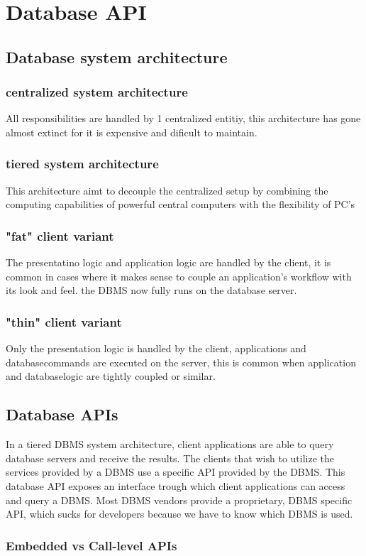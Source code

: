 \documentclass{report}
\begin{document}
	\chapter{Database API}
		\section{Database system architecture}
			\subsection{centralized system architecture}
				All responsibilities are handled by 1 centralized entitiy, this architecture has gone almost extinct for it is expensive and dificult to maintain.
			\subsection{tiered system architecture}
				This architecture aimt to decouple the centralized setup by combining the computing capabilities of powerful central computers with the flexibility of PC's
			\subsection{"fat" client variant}
				The presentatino logic and application logic are handled by the client, it is common in cases where it makes sense to couple an application's workflow with its look and feel. the DBMS now fully runs on the database server.
			\subsection{"thin" client variant}
				Only the presentation logic is handled by the client, applications and databasecommands are executed on the server, this is common when application and databaselogic are tightly coupled or similar.
		\section{Database APIs}
			In a tiered DBMS system architecture, client applications are able to query database servers and receive the results. The clients that wish to utilize the services provided by a DBMS use a specific API provided by the DBMS. This database API exposes an interface trough which client applications can access and query a DBMS.
			Most DBMS vendors provide a proprietary, DBMS specific API, which sucks for developers because we have to know which DBMS is used.
			\subsection{Embedded vs Call-level APIs}
\end{document}
